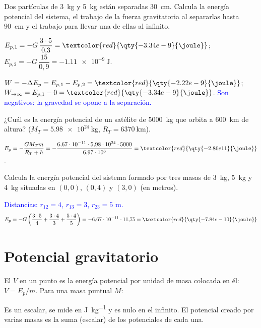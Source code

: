 \begin{exercise}
    Dos partículas de \qty{3}{\kg} y \qty{5}{\kg} están separadas \qty{30}{\cm}. Calcula la energía potencial del sistema, el
    trabajo de la fuerza gravitatoria al separarlas hasta \qty{90}{\cm} y el trabajo para llevar una de ellas al infinito.
    \begin{solu}
        \(E_{p,1} = -G\,\dfrac{3\cdot 5}{0{,}3} = \textcolor{red}{\qty{-3.34e-9}{\joule}}\); \(E_{p,2} = -G\,\dfrac{15}{0{,}9} = \qty{-1.11e-9}{\joule}\).

        \(W = -\Delta E_p = E_{p,1} - E_{p,2} = \textcolor{red}{\qty{-2.22e-9}{\joule}}\);
        \(W_{\to\infty} = E_{p,1} - 0 = \textcolor{red}{\qty{-3.34e-9}{\joule}}\).
        \textcolor{blue}{Son negativos: la gravedad se opone a la separación.}
    \end{solu}
\end{exercise}

\begin{exercise}
    ¿Cuál es la energía potencial de un satélite de \qty{5000}{\kg} que orbita a \qty{600}{\km} de altura?
    (\(M_T = \qty{5.98e24}{\kg}\), \(R_T = \qty{6370}{\km}\)).
    \begin{solu}
        \(E_p = -\dfrac{G M_T m}{R_T + h} = -\dfrac{6{,}67\cdot 10^{-11}\cdot 5{,}98\cdot 10^{24}\cdot 5000}{6{,}97\cdot 10^6} = \textcolor{red}{\qty{-2.86e11}{\joule}}\).
    \end{solu}
\end{exercise}

\begin{exercise}
    Calcula la energía potencial del sistema formado por tres masas de \qty{3}{\kg}, \qty{5}{\kg} y \qty{4}{\kg} situadas en
    \((0, 0)\), \((0, 4)\) y \((3, 0)\) (en metros).
    \begin{solu}
        \textcolor{blue}{Distancias: \(r_{12} = 4\), \(r_{13} = 3\), \(r_{23} = 5\) m.}
        \[ E_p = -G\left(\dfrac{3\cdot 5}{4} + \dfrac{3\cdot 4}{3} + \dfrac{5\cdot 4}{5}\right) = -6{,}67\cdot 10^{-11}\cdot 11{,}75 = \textcolor{red}{\qty{-7.84e-10}{\joule}} \]
    \end{solu}
\end{exercise}

\section{Potencial gravitatorio}\label{sec:grav-potencial}

\begin{definition}
    El  \(V\) en un punto es la energía potencial por unidad de masa colocada en él:
    \(V = E_p/m\). Para una masa puntual \(M\):
    \begin{centeredequation}
         \label{eq:grav-V}
    \end{centeredequation}
    Es un escalar, se mide en \unit{\joule\per\kg} y es nulo en el infinito. El potencial creado por varias masas es la suma
    (escalar) de los potenciales de cada una.
\end{definition}

